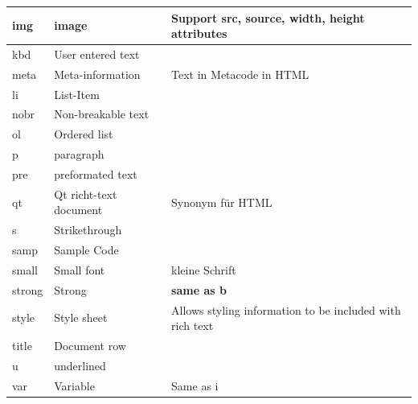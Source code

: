\begin{longtable}{| p{} | p{} | p{}|}
	\hline img&image& Support src, source, width, height attributes\\
	\hline kbd& User entered text&\\
	\hline meta & Meta-information& Text in Metacode in HTML\\
	\hline li & List-Item&\\
	\hline nobr & Non-breakable text&\\
	\hline ol & Ordered list& \\
	\hline p & paragraph&\\
	\hline pre & preformated text& \\
	\hline qt & Qt richt-text document& Synonym für HTML\\
	\hline s& Strikethrough&\\
	\hline samp & Sample Code&\\
	\hline small & Small font &{\scriptsize kleine Schrift}\\
	\hline strong & Strong & \textbf{same as b}\\
	\hline style & Style sheet & Allows styling information to be included with rich text\\
	\hline title & Document row & \\
	\hline u & underlined & \\
	\hline var & Variable & Same as i\\
	\hline
\end{longtable}
\clearpage
\newpage
